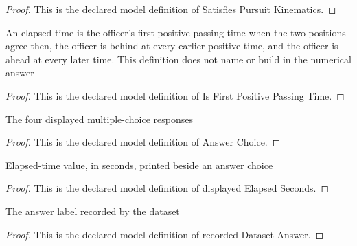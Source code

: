 \begin{proof}
  This is the declared model definition of Satisfies Pursuit Kinematics.
\end{proof}
\begin{definition}
  \label{def:physics:phyx-mini-0794:phyxminiproblems-problemphyxmini0794-isfirstpositivepassingtime}
  An elapsed time is the officer's first positive passing time when the two positions agree then, the officer is behind at every earlier positive time, and the officer is ahead at every later time. This definition does not name or build in the numerical answer
\end{definition}
\begin{proof}
  This is the declared model definition of Is First Positive Passing Time.
\end{proof}
\begin{definition}
  \label{def:physics:phyx-mini-0794:phyxminiproblems-problemphyxmini0794-answerchoice}
  The four displayed multiple-choice responses
\end{definition}
\begin{proof}
  This is the declared model definition of Answer Choice.
\end{proof}
\begin{definition}
  \label{def:physics:phyx-mini-0794:phyxminiproblems-problemphyxmini0794-displayedelapsedseconds}
  Elapsed-time value, in seconds, printed beside an answer choice
\end{definition}
\begin{proof}
  This is the declared model definition of displayed Elapsed Seconds.
\end{proof}
\begin{definition}
  \label{def:physics:phyx-mini-0794:phyxminiproblems-problemphyxmini0794-recordeddatasetanswer}
  The answer label recorded by the dataset
\end{definition}
\begin{proof}
  This is the declared model definition of recorded Dataset Answer.
\end{proof}
